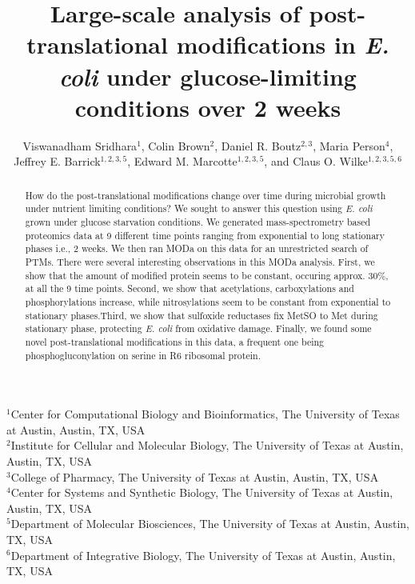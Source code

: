 \documentclass[12pt]{article}
\begin{document}
\title{Large-scale analysis of post-translational modifications in \emph{E. coli} under glucose-limiting conditions over 2 weeks}

\author{Viswanadham Sridhara$^1$, Colin Brown$^{2}$, Daniel R. Boutz$^{2,3}$, Maria Person$^{4}$,\\
Jeffrey E. Barrick$^{1,2,3,5}$, Edward M. Marcotte$^{1,2,3,5}$, and Claus O. Wilke$^{1,2,3,5,6}$}
\maketitle

\noindent
$^1$Center for Computational Biology and Bioinformatics, The University of Texas at Austin, Austin, TX, USA\\
$^2$Institute for Cellular and Molecular Biology, The University of Texas at Austin, Austin, TX, USA\\
$^3$College of Pharmacy, The University of Texas at Austin, Austin, TX, USA\\
$^4$Center for Systems and Synthetic Biology, The University of Texas at Austin, Austin, TX, USA\\
$^5$Department of Molecular Biosciences, The University of Texas at Austin, Austin, TX, USA\\
$^6$Department of Integrative Biology, The University of Texas at Austin, Austin, TX, USA\\


\begin{abstract}
How do the post-translational modifications change over time during microbial growth under nutrient limiting conditions? We sought to answer this question using \emph{E. coli} grown under glucose starvation conditions. We generated mass-spectrometry based proteomics data at 9 different time points ranging from exponential to long stationary phases i.e., 2 weeks. We then ran MODa on this data for an unrestricted search of PTMs. There were several interesting observations in this MODa analysis. First, we show that the amount of modified protein seems to be constant, occuring approx. 30\%, at all the 9 time points. Second, we show that acetylations, carboxylations and phosphorylations increase, while nitrosylations seem to be constant from exponential to stationary phases.Third, we show that sulfoxide reductases fix MetSO to Met during stationary phase, protecting \emph{E. coli} from oxidative damage. Finally, we found some novel post-translational modifications in this data, a frequent one being phosphogluconylation on serine in R6 ribosomal protein.
\end{abstract}
\end{document}
